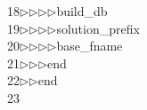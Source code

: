\begin{tabbing}
18\>$\triangleright$\>$\triangleright$\>$\triangleright$\>$\triangleright$\>build\_db\ \\[0pt]
19\>$\triangleright$\>$\triangleright$\>$\triangleright$\>$\triangleright$\>solution\_prefix\ \ \\[0pt]
20\>$\triangleright$\>$\triangleright$\>$\triangleright$\>$\triangleright$\>base\_fname\ \ \\[0pt]
21\>$\triangleright$\>$\triangleright$\>$\triangleright$\>end\ \\[0pt]
22\>$\triangleright$\>$\triangleright$\>end\\[0pt]
23\>\end{tabbing}
